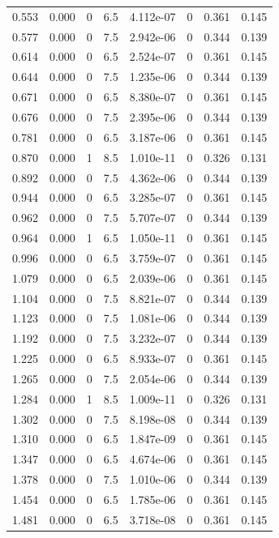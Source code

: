 \documentclass[preview]{standalone}
\begin{document}
{{\begin{tabular}{L{1.2cm}C{1.2cm} C{0.3cm}C{0.5cm} C{1.4cm}C{1.4cm} C{1.4cm}C{1.4cm}}
  0.553  &  0.000  & 0     & 6.5 &  4.112e-07  & 0  & 0.361 &  0.145   \\ 
  0.577  &  0.000  & 0     & 7.5 &  2.942e-06  & 0  & 0.344 &  0.139   \\ 
  0.614  &  0.000  & 0     & 6.5 &  2.524e-07  & 0  & 0.361 &  0.145   \\ 
  0.644  &  0.000  & 0     & 7.5 &  1.235e-06  & 0  & 0.344 &  0.139   \\ 
  0.671  &  0.000  & 0     & 6.5 &  8.380e-07  & 0  & 0.361 &  0.145   \\ 
  0.676  &  0.000  & 0     & 7.5 &  2.395e-06  & 0  & 0.344 &  0.139   \\ 
  0.781  &  0.000  & 0     & 6.5 &  3.187e-06  & 0  & 0.361 &  0.145   \\ 
  0.870  &  0.000  & 1     & 8.5 &  1.010e-11  & 0  & 0.326 &  0.131   \\ 
  0.892  &  0.000  & 0     & 7.5 &  4.362e-06  & 0  & 0.344 &  0.139   \\ 
  0.944  &  0.000  & 0     & 6.5 &  3.285e-07  & 0  & 0.361 &  0.145   \\ 
  0.962  &  0.000  & 0     & 7.5 &  5.707e-07  & 0  & 0.344 &  0.139   \\ 
  0.964  &  0.000  & 1     & 6.5 &  1.050e-11  & 0  & 0.361 &  0.145   \\ 
  0.996  &  0.000  & 0     & 6.5 &  3.759e-07  & 0  & 0.361 &  0.145   \\ 
  1.079  &  0.000  & 0     & 6.5 &  2.039e-06  & 0  & 0.361 &  0.145   \\ 
  1.104  &  0.000  & 0     & 7.5 &  8.821e-07  & 0  & 0.344 &  0.139   \\ 
  1.123  &  0.000  & 0     & 7.5 &  1.081e-06  & 0  & 0.344 &  0.139   \\ 
  1.192  &  0.000  & 0     & 7.5 &  3.232e-07  & 0  & 0.344 &  0.139   \\ 
  1.225  &  0.000  & 0     & 6.5 &  8.933e-07  & 0  & 0.361 &  0.145   \\ 
  1.265  &  0.000  & 0     & 7.5 &  2.054e-06  & 0  & 0.344 &  0.139   \\ 
  1.284  &  0.000  & 1     & 8.5 &  1.009e-11  & 0  & 0.326 &  0.131   \\ 
  1.302  &  0.000  & 0     & 7.5 &  8.198e-08  & 0  & 0.344 &  0.139   \\ 
  1.310  &  0.000  & 0     & 6.5 &  1.847e-09  & 0  & 0.361 &  0.145   \\ 
  1.347  &  0.000  & 0     & 6.5 &  4.674e-06  & 0  & 0.361 &  0.145   \\ 
  1.378  &  0.000  & 0     & 7.5 &  1.010e-06  & 0  & 0.344 &  0.139   \\ 
  1.454  &  0.000  & 0     & 6.5 &  1.785e-06  & 0  & 0.361 &  0.145   \\ 
  1.481  &  0.000  & 0     & 6.5 &  3.718e-08  & 0  & 0.361 &  0.145   \\ 
\hline 
\end{tabular} 

}}
\end{document}
